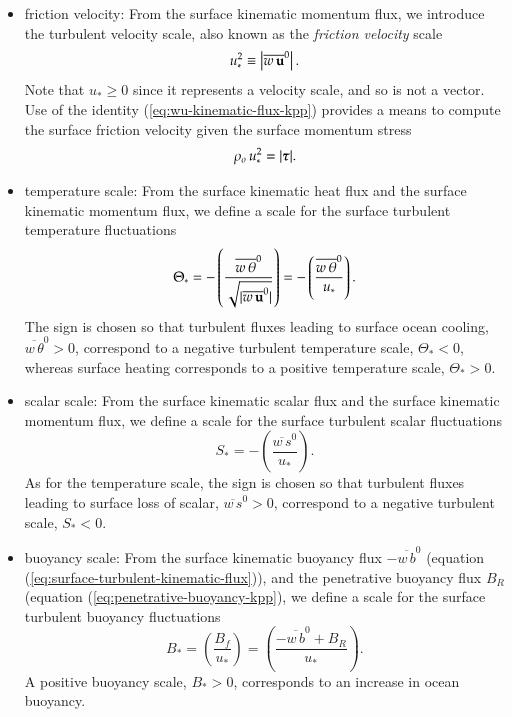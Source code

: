 \begin{itemize}

\item {\sc friction velocity}: From the surface kinematic momentum
  flux, we introduce the turbulent velocity scale, also known as the
  {\it friction velocity} scale
\begin{equation}
  u_{*}^{2} \equiv \left| \overline{w \, {\bf u}}^{0} \right|.
\label{eq:friction-velocity-defined}
\end{equation}
Note that $u_{*} \ge 0$ since it represents a velocity scale, and so
is not a vector.  Use of the identity (\ref{eq:wu-kinematic-flux-kpp})
provides a means to compute the surface friction velocity given the
surface momentum stress
\begin{equation}
  \rho_{o} \, u_{*}^{2} = | \mbox{\boldmath $\tau$} |.
\label{eq:friction-velocity}
\end{equation}

\item {\sc temperature scale}: From the surface kinematic heat flux
  and the surface kinematic momentum flux, we define a scale for the
  surface turbulent temperature fluctuations
\begin{equation}
  \Theta_{*} = 
  -\left( 
   \frac{\overline{w \, \theta}^{0}}{  \sqrt { |\overline{w \, {\bf u}}^{0} | } }
   \right)
 = 
  -\left( 
   \frac{\overline{w \, \theta}^{0}}{  u_{*}}  \right).
\label{eq:turbulent-temp-fluctuations}
\end{equation}
The sign is chosen so that turbulent fluxes leading to surface ocean
cooling, $\overline{w \, \theta}^{0} > 0$, correspond to a negative
turbulent temperature scale, $\Theta_{*} < 0$, whereas surface heating
corresponds to a positive temperature scale, $\Theta_{*} > 0$.

\item {\sc scalar scale}: From the surface kinematic scalar flux and
 the surface kinematic momentum flux, we define a scale for the
  surface turbulent scalar fluctuations
\begin{equation}
  S_{*} = 
  -\left( 
   \frac{\overline{w \, s}^{0}}{  u_{*}}  \right).
\label{eq:scalar-turbulent-scale-m-o}
\end{equation}
As for the temperature scale, the sign is chosen so that turbulent
fluxes leading to surface loss of scalar, $\overline{w \, s}^{0} >
0$, correspond to a negative turbulent scale, $S_{*} < 0$.

\item {\sc buoyancy scale}: From the surface kinematic buoyancy flux
  $-\overline{w \, b}^{0}$ (equation
  (\ref{eq:surface-turbulent-kinematic-flux})), and the penetrative
  buoyancy flux $B_{R}$ (equation (\ref{eq:penetrative-buoyancy-kpp}),
  we define a scale for the surface turbulent buoyancy fluctuations
\begin{equation}
  B_{*} = 
  \left( 
   \frac{B_{f} } {  u_{*} }
   \right)
 =
  \left( 
   \frac{-\overline{w \, b}^{0} + B_{R} } {  u_{*} }
   \right).
\label{eq:buoyancy-scale-defined}
\end{equation}
A positive buoyancy scale, $B_{*} > 0$, corresponds to an increase in
ocean buoyancy.


\end{itemize}


